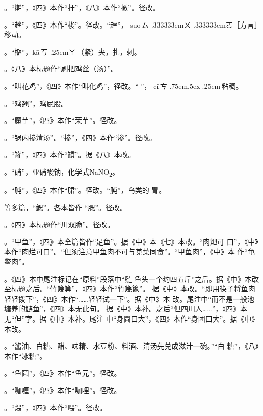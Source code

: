 \begin{list}{}
。“擀”，《四》本作“扞”，《八》本作“撖”。径改。

。“趖”，《四》本作“梭”。径改。“趖”，
{su\={o}}\,{ㄙ\kern-.333333emㄨ\kern-.333333emㄛ}［方言］移动。

。“㮟”，{k\={a}}\,{ㄎ\kern-.25emㄚ}\,（紧）夹，扎，刺。

。《八》本标题作“刷把鸡丝（汤）”。

。“叫花鸡”，《四》本作“叫化鸡”，径改。“𫃕”，%
{c\'{i}}\,{ㄘ\kern-.75em\raise.5ex\hbox{\'{}}\kern.25em}\,粘稠。

。“鸡翘”，鸡屁股。

。“魔芋”，《四》本作“茉芋”。径改。

。“锅内掺清汤”。“掺”，《四》本作“渗”。径改。

。“罐”，《四》本作“罆”。据《八》本改。

。“硝”，亚硝酸钠，化学式NaNO\textsubscript{2}。

。“肫”，《四》本作“𬂁”。径改。“肫”，鸟类的
胃。

等多篇，“鳃”。各本皆作
“腮”。径改。

。《四》本标题作“川双脆”。径改。

。“甲鱼”，《四》本全篇皆作“足鱼”。据《中》本《七》本改。“肉𤆵可
口”，《中》本作“肉烂可口”。“但须注意甲鱼肉不可与苋菜同食”。“甲鱼肉”，《中》本
作“龟鳖肉”。

。《四》本中尾注标记{\footnotesize{}}在“原料”段落中“鲢
鱼头一个约四五斤”之后。据《中》本改至标题之后。“竹篾箅”，《四》本作“竹篾篦”。
据《中》本改。“即用筷子将鱼肉轻轻拨下”，《四》本作“……轻轻试一下”。据《中》本
改。尾注{\footnotesize{}}中“而不是一般池塘养的鲢鱼”，《四》本无此句。
据《中》本补。之后“但四川人……”，《四》本无“但”字。据《中》本补。尾注
{\footnotesize{}}中“身圆口大”，《四》本作“身团口大”。据《中》本改。

。“酱油、白糖、醋、味精、水豆粉、料酒、清汤先兑成滋汁一碗。”“白
糖”，《八》本作“冰糖”。

。“鱼圆”，《四》本作“鱼元”。径改。

。“咖喱”，《四》本作“咖哩”。径改。

。“煨”，《四》本作“喂”。径改。


\end{list}
